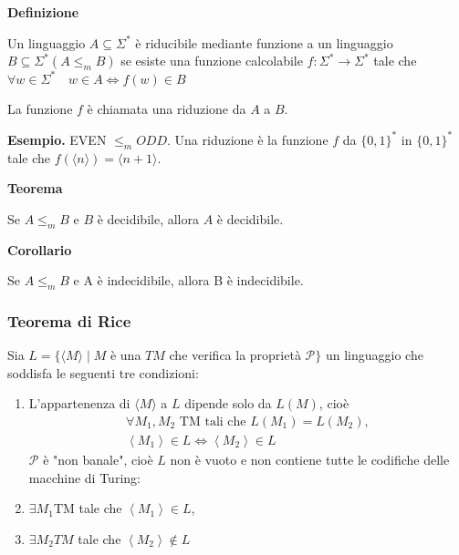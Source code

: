 \vspace{5mm}

\textbf{Definizione}


Un linguaggio $A \subseteq \Sigma^{*}$ è riducibile mediante funzione a un linguaggio $B \subseteq \Sigma^{*}\left(A \leq_{m} B\right)$ se esiste una funzione calcolabile $f: \Sigma^{*} \rightarrow \Sigma^{*}$ tale che
$\forall w \in \Sigma^{*} \quad w \in A \Leftrightarrow f(w) \in B$

La funzione $f$ è chiamata una riduzione da $A$ a $B$.

\vspace{5mm}

\textbf{Esempio.} EVEN $\leq_{m} O D D$. Una riduzione è la funzione $f$ da $\{0,1\}^{*}$ in $\{0,1\}^{*}$ tale che $f(\langle n\rangle)=\langle n+1\rangle$.

\vspace{5mm}

\textbf{Teorema}

Se $A \leq_{m} B$ e $B$ è decidibile, allora $A$ è decidibile.

\vspace{5mm}

\textbf{Corollario}

Se $A \leq_{m} B$ e A è indecidibile, allora B è indecidibile.

\subsubsection{Teorema di Rice}

Sia
$L=\{\langle M\rangle \mid M$ è una $T M$ che verifica la proprietà $\mathcal{P}\}$
un linguaggio che soddisfa le seguenti tre condizioni:
\begin{enumerate}
    \item L'appartenenza di $\langle M\rangle$ a $L$ dipende solo da $L(M)$, cioè
$$
\begin{gathered}
\forall M_{1}, M_{2} \text { TM tali che } L\left(M_{1}\right)=L\left(M_{2}\right), \\
\left\langle M_{1}\right\rangle \in L \Leftrightarrow\left\langle M_{2}\right\rangle \in L
\end{gathered}
$$
$\mathcal{P}$ è "non banale", cioè $L$ non è vuoto e non contiene tutte le codifiche delle macchine di Turing:
    \item $\exists M_{1} \mathrm{TM}$ tale che $\left\langle M_{1}\right\rangle \in L$,
    \item $\exists M_{2} T M$ tale che $\left\langle M_{2}\right\rangle \notin L$
\end{enumerate}

